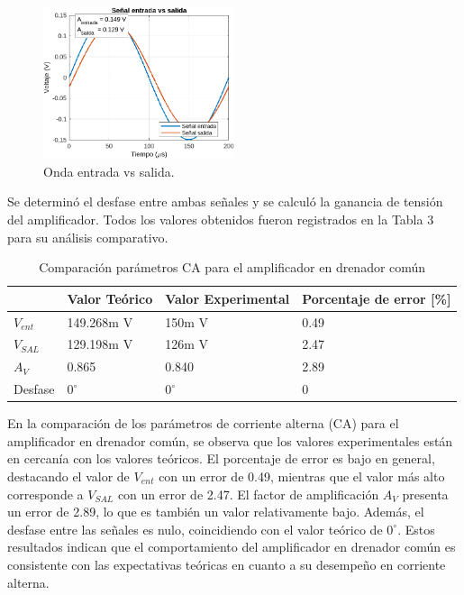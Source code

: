 \documentclass[journal]{IEEEtran}
\begin{document}
\begin{figure}[H]
    \centering
    \includegraphics[width=0.5\textwidth]{Media/onda_entrada_salida.png}
    \caption{Onda entrada vs salida.}
    \label{fig:onda_entrada_salida.}
\end{figure}
\par Se determinó el desfase entre ambas señales y se calculó la ganancia de tensión del amplificador. Todos los valores obtenidos fueron registrados en la Tabla 3 para su análisis comparativo.
\begin{table}[h]
    \caption{Comparación parámetros CA para el amplificador en drenador común}
    \centering
    \renewcommand{\arraystretch}{1.2} %
    \begin{tabular}{|l|p{2cm}|p{2cm}|p{2cm}|}
        \hline
        & \textbf{Valor Teórico} & \textbf{Valor Experimental} & \textbf{Porcentaje de error [\%]} \\
        \hline
        \( V_{ent}\) & 149.268m V   & 150m V  & 0.49 \\
        \hline
        \( V_{SAL} \) & 129.198m V    & 126m V  & 2.47 \\
        \hline
        \( A_V \) & 0.865 & 0.840 & 2.89 \\
        \hline
        Desfase & $0^\circ$ & $0^\circ$ & 0 \\
        \hline
    \end{tabular}
    \label{tab:resistencias}
\end{table}
\par En la comparación de los parámetros de corriente alterna (CA) para el amplificador en drenador común, se observa que los valores experimentales están en cercanía con los valores teóricos. El porcentaje de error es bajo en general, destacando el valor de \( V_{ent}\) con un error de 0.49, mientras que el valor más alto corresponde a \( V_{SAL} \) con un error de 2.47. El factor de amplificación \( A_V \) presenta un error de 2.89, lo que es también un valor relativamente bajo. Además, el desfase entre las señales es nulo, coincidiendo con el valor teórico de $0^\circ$. Estos resultados indican que el comportamiento del amplificador en drenador común es consistente con las expectativas teóricas en cuanto a su desempeño en corriente alterna.
\end{document}
